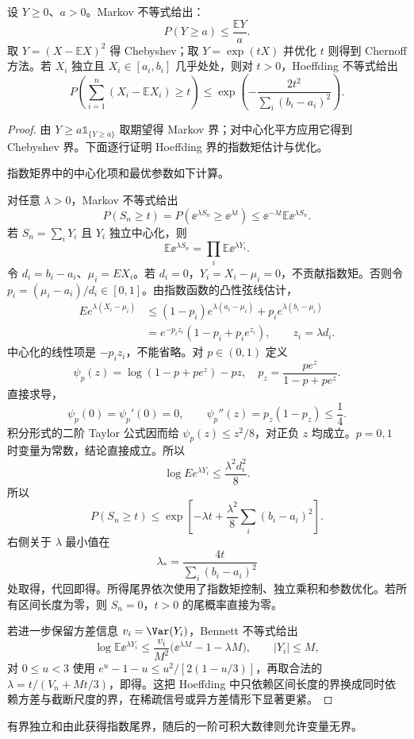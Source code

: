 \begin{proposition}
设 $Y\ge0$、$a>0$。Markov 不等式给出：
\[
P(Y\ge a)\le\frac{\mathbb E Y}{a}.
\]
取 $Y=(X-\mathbb E X)^2$ 得 Chebyshev；取 $Y=\exp(tX)$ 并优化 $t$ 则得到 Chernoff 方法。若 $X_i$ 独立且 $X_i\in[a_i,b_i]$ 几乎处处，则对 $t>0$，Hoeffding 不等式给出
\begin{equation}
P\!\left(
\sum_{i=1}^n(X_i-\mathbb E X_i)\ge t
\right)
\le
\exp\!\left(
-\frac{2t^2}{\sum_i(b_i-a_i)^2}
\right).
\label{eq:math-stat-hoeffding}
\end{equation}
\end{proposition}
\begin{proof}
由 $Y\ge a\mathds{1}_{\{Y\ge a\}}$ 取期望得 Markov 界；对中心化平方应用它得到 Chebyshev 界。下面逐行证明 Hoeffding 界的指数矩估计与优化。

指数矩界中的中心化项和最优参数如下计算。

对任意 $\lambda>0$，Markov 不等式给出
\[
P(S_n\ge t)
=P(\ee^{\lambda S_n}\ge\ee^{\lambda t})
\le
\ee^{-\lambda t}\mathbb E\ee^{\lambda S_n}.
\]
若 $S_n=\sum_iY_i$ 且 $Y_i$ 独立中心化，则
\[
\mathbb E\ee^{\lambda S_n}
=\prod_i\mathbb E\ee^{\lambda Y_i}.
\]
令 $d_i=b_i-a_i$、$\mu_i=EX_i$。若 $d_i=0$，$Y_i=X_i-\mu_i=0$，不贡献指数矩。否则令 $p_i=(\mu_i-a_i)/d_i\in[0,1]$。由指数函数的凸性弦线估计，
\begin{align*}
 Ee^{\lambda(X_i-\mu_i)}
 &\le(1-p_i)e^{\lambda(a_i-\mu_i)}+p_i e^{\lambda(b_i-\mu_i)}\\
 &=e^{-p_i z_i}(1-p_i+p_i e^{z_i}),\qquad z_i=\lambda d_i.
\end{align*}
中心化的线性项是 $-p_i z_i$，不能省略。对 $p\in(0,1)$ 定义
\[
 \psi_p(z)=\log(1-p+pe^z)-pz,
 \quad p_z=\frac{pe^z}{1-p+pe^z}.
\]
直接求导，
\[
 \psi_p(0)=\psi_p'(0)=0,\qquad
 \psi_p''(z)=p_z(1-p_z)\le\frac14.
\]
积分形式的二阶 Taylor 公式因而给 $\psi_p(z)\le z^2/8$，对正负 $z$ 均成立。$p=0,1$ 时变量为常数，结论直接成立。所以
\[
 \log Ee^{\lambda Y_i}\le\frac{\lambda^2d_i^2}{8}.
\]
所以
\[
P(S_n\ge t)
\le
\exp\!\left[
-\lambda t
+\frac{\lambda^2}{8}\sum_i(b_i-a_i)^2
\right].
\]
右侧关于 $\lambda$ 最小值在
\[
\lambda_*
=\frac{4t}{\sum_i(b_i-a_i)^2}
\]
处取得，代回即得。所得尾界依次使用了指数矩控制、独立乘积和参数优化。若所有区间长度为零，则 $S_n=0$，$t>0$ 的尾概率直接为零。

若进一步保留方差信息 $v_i=\Var(Y_i)$，Bennett 不等式给出
\[
\log\mathbb E\ee^{\lambda Y_i}
\le
\frac{v_i}{M^2}\bigl(\ee^{\lambda M}-1-\lambda M\bigr),
\qquad |Y_i|\le M,
\]
对 $0\le u<3$ 使用 $e^u-1-u\le u^2/[2(1-u/3)]$，再取合法的 $\lambda=t/(V_n+Mt/3)$，即得。这把 Hoeffding 中只依赖区间长度的界换成同时依赖方差与截断尺度的界，在稀疏信号或异方差情形下显著更紧。
\end{proof}
有界独立和由此获得指数尾界，随后的一阶可积大数律则允许变量无界。

